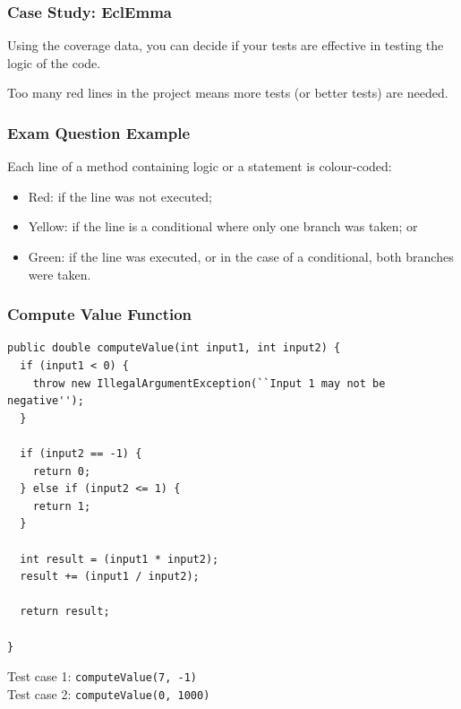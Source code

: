 \begin{frame}
\frametitle{Case Study: EclEmma}
\begin{changemargin}{1cm}
Using the coverage data, you can decide if your tests are effective in testing the logic of the code. 

Too many red lines in the project means more tests (or better tests) are needed.


\end{changemargin}
\end{frame}

\begin{frame}
\frametitle{Exam Question Example}
\begin{changemargin}{1cm}


Each line of a method containing logic or a statement is colour-coded:
\vspace{-1em}
\begin{itemize}
\item Red: if the line was not executed;
\item Yellow: if the line is a conditional where only one branch was taken;
or
\item Green: if the line was executed, or in the case of a conditional, both branches were taken.
\end{itemize}

\end{changemargin}
\end{frame}


\begin{frame}[fragile]
\frametitle{Compute Value Function}
\begin{changemargin}{1cm}



{\scriptsize
\begin{verbatim}
public double computeValue(int input1, int input2) {
  if (input1 < 0) {
    throw new IllegalArgumentException(``Input 1 may not be negative'');
  }
  
  if (input2 == -1) {
    return 0;
  } else if (input2 <= 1) {
    return 1;
  }
 
  int result = (input1 * input2); 
  result += (input1 / input2);
  
  return result;

}
\end{verbatim}
}

Test case 1: \texttt{computeValue(7, -1)}\\
Test case 2: \texttt{computeValue(0, 1000)}

\end{changemargin}
\end{frame}

